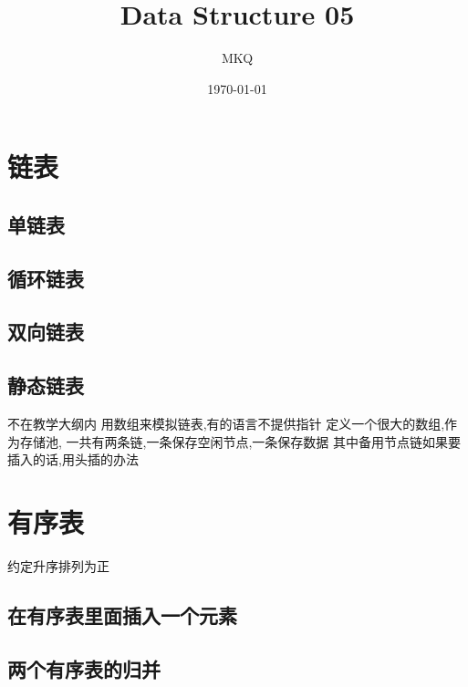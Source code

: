 \documentclass[11pt]{article}
\author{MKQ}
\date{\today}
\title{Data Structure 05}
\begin{document}
\maketitle
\tableofcontents

\section{链表}
\label{sec:org8ef5ef8}
\subsection{单链表}
\label{sec:org71fcd45}
\subsection{循环链表}
\label{sec:org6cec08a}
\subsection{双向链表}
\label{sec:org5513580}
\subsection{静态链表}
\label{sec:org2cb3418}
不在教学大纲内
用数组来模拟链表,有的语言不提供指针
定义一个很大的数组,作为存储池,
一共有两条链,一条保存空闲节点,一条保存数据
其中备用节点链如果要插入的话,用头插的办法
\section{有序表}
\label{sec:org84b55ca}
约定升序排列为正
\subsection{在有序表里面插入一个元素}
\label{sec:orgcc4bab1}
\subsection{两个有序表的归并}
\label{sec:org0b1d345}
\end{document}
